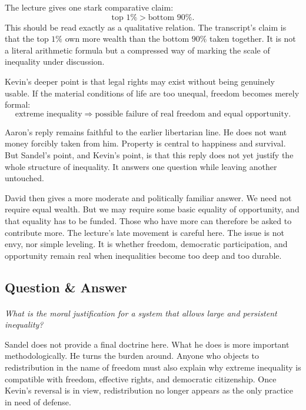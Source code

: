 The lecture gives one stark comparative claim:
\begin{equation}
\text{top }1\%
>
\text{bottom }90\%.
\end{equation}
This should be read exactly as a qualitative relation. The transcript's claim is that the top \(1\%\) own more wealth than the bottom \(90\%\) taken together. It is not a literal arithmetic formula but a compressed way of marking the scale of inequality under discussion.

Kevin's deeper point is that legal rights may exist without being genuinely usable. If the material conditions of life are too unequal, freedom becomes merely formal:
\begin{equation}
\text{extreme inequality}
\Longrightarrow
\text{possible failure of real freedom and equal opportunity}.
\end{equation}

Aaron's reply remains faithful to the earlier libertarian line. He does not want money forcibly taken from him. Property is central to happiness and survival. But Sandel's point, and Kevin's point, is that this reply does not yet justify the whole structure of inequality. It answers one question while leaving another untouched.

David then gives a more moderate and politically familiar answer. We need not require equal wealth. But we may require some basic equality of opportunity, and that equality has to be funded. Those who have more can therefore be asked to contribute more. The lecture's late movement is careful here. The issue is not envy, nor simple leveling. It is whether freedom, democratic participation, and opportunity remain real when inequalities become too deep and too durable.

\subsection{Question \& Answer}

\paragraph{}
\emph{What is the moral justification for a system that allows large and persistent inequality?}

Sandel does not provide a final doctrine here. What he does is more important methodologically. He turns the burden around. Anyone who objects to redistribution in the name of freedom must also explain why extreme inequality is compatible with freedom, effective rights, and democratic citizenship. Once Kevin's reversal is in view, redistribution no longer appears as the only practice in need of defense.

